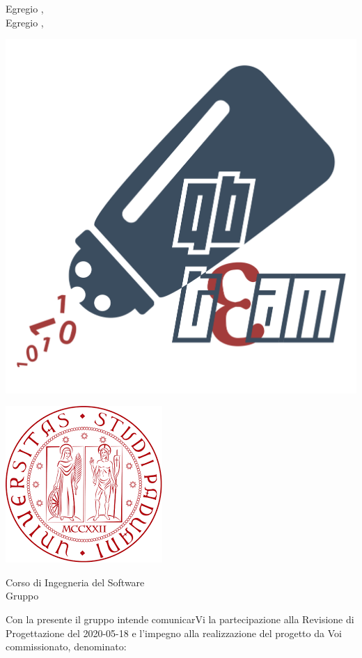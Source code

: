\documentclass[12pt,a4paper]{letter}
\begin{document}
    \begin{letter}
        { Egregio \VT{},\\Egregio \CR{},}
        \begin{minipage}{.4\textwidth}
            \begin{flushleft}
                \includegraphics[width=.4\linewidth]{../Utilita/Immagini/qbteam.png}
            \end{flushleft}
        \end{minipage}
        \begin{minipage}{.5\textwidth}
            \begin{flushright}
                \includegraphics[width=.4\linewidth]{../Utilita/Immagini/LogoUniPD.png}
            \end{flushright}
        \end{minipage}
        {    
        \begin{flushleft}
            Corso di Ingegneria del Software\\ Gruppo \Gruppo{}\\ 
        \end{flushleft}
        }
        \opening{ Con la presente il gruppo \Gruppo{} intende comunicarVi la partecipazione alla Revisione di Progettazione del 2020-05-18 e l'impegno alla realizzazione del progetto da Voi commissionato, denominato:}
        \begin{center}
           \textbf{\NomeProgetto{}} 
        \end{center}

\end{letter}
\end{document}
